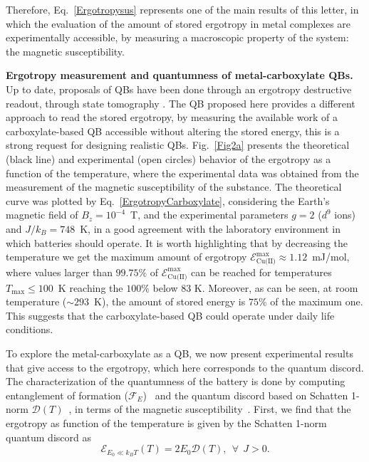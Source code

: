 \documentclass[aps,prl,epsfigure,twocolumn,superscriptaddress]{revtex4-1}
\newcommand{\Dcal}{\mathcal{D}}
\newcommand{\Ecal}{\mathcal{E}}
\newcommand{\Fcal}{\mathcal{F}}
\newcommand{\1}{\mathbbm{1}}
\begin{document}
Therefore, Eq.~\eqref{Ergotropysus} represents one of the main results of this letter, in which the evaluation of the amount of stored ergotropy in metal complexes are experimentally accessible, by measuring a macroscopic property of the system: the magnetic susceptibility.

\textbf{Ergotropy measurement and quantumness of metal-carboxylate QBs.} Up to date, proposals of QBs have been done through an ergotropy destructive readout, through state tomography \cite{Liu:19,Ferraro:18,Le:18,strambini2020josephson,Alexia:20}. The QB proposed here provides a different approach to read the stored ergotropy, by measuring the available work of a carboxylate-based QB accessible without altering the stored energy, this is a strong request for designing realistic QBs. Fig.~\ref{Fig2a} presents the theoretical (black line) and experimental (open circles) behavior of the ergotropy as a function of the temperature, where the experimental data was obtained from the measurement of the magnetic susceptibility of the substance. The theoretical curve was plotted by Eq.~\eqref{ErgotropyCarboxylate}, considering the Earth's magnetic field of $B_z\!=\!10^{-4}$~T, and the experimental parameters $g=2$ ($d^{9}$ ions) and $J/k_{B}\!=\!748$~K, in a good agreement with the laboratory environment in which batteries should operate. It is worth highlighting that by decreasing the temperature we get the maximum amount of ergotropy $\Ecal^{\text{max}}_{\text{Cu(II)}}\!\approx\!1.12$~mJ/mol, where values larger than $99.75\%$ of $\Ecal^{\text{max}}_{\text{Cu(II)}}$ can be reached for temperatures $T_{\text{max}}\!\leq\!100$~K reaching the $100\%$ below $83$ K. Moreover, as can be seen, at room temperature ($\sim293$~K), the amount of stored energy is $75\%$ of the maximum one. This suggests that the carboxylate-based QB could operate under daily life conditions.

To explore the metal-carboxylate as a QB, we now present experimental results that give access to the ergotropy, which here corresponds to the quantum discord. The characterization of the quantumness of the battery is done by computing entanglement of formation ($\Fcal_{E}$)~\cite{Hill:97,Wootters:98} and the quantum discord based on Schatten 1-norm $\Dcal(T)$~\cite{Ciccarello:14}, in terms of the magnetic susceptibility~\cite{SupInf}. First, we find that the ergotropy as function of the temperature is given by the Schatten 1-norm quantum discord as~\cite{SupInf}
\begin{equation}
	\Ecal_{E_0\ll k_{B}T}(T)  = 2E_0 \Dcal(T) , ~~ \forall ~~ J>0 .
	\label{discord}
\end{equation}
\end{document}
